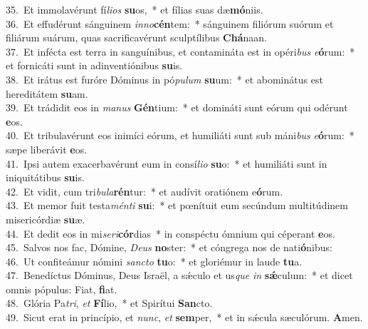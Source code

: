 {35.~}Et immolavérunt fí\textit{li}\textit{os} \textbf{su}os,~* et fílias suas dæ\textbf{mó}niis.\\
{36.~}Et effudérunt sánguinem \textit{in}\textit{no}\textbf{cén}tem:~* sánguinem filiórum suórum et filiárum suárum, quas sacrificavérunt sculptílibus \textbf{Chá}naan.\\
{37.~}Et infécta est terra in sanguínibus, et contamináta est in opéri\textit{bus} \textit{e}\textbf{ó}rum:~* et fornicáti sunt in adinventiónibus \textbf{su}is.\\
{38.~}Et irátus est furóre Dóminus in pó\textit{pu}\textit{lum} \textbf{su}um:~* et abominátus est hereditátem \textbf{su}am.\\
{39.~}Et trádidit eos in \textit{ma}\textit{nus} \textbf{Gén}tium:~* et domináti sunt eórum qui odérunt \textbf{e}os.\\
{40.~}Et tribulavérunt eos inimíci eórum, et humiliáti sunt sub máni\textit{bus} \textit{e}\textbf{ó}rum:~* sæpe liberávit \textbf{e}os.\\
{41.~}Ipsi autem exacerbavérunt eum in consí\textit{li}\textit{o} \textbf{su}o:~* et humiliáti sunt in iniquitátibus \textbf{su}is.\\
{42.~}Et vidit, cum tri\textit{bu}\textit{la}\textbf{rén}tur:~* et audívit oratiónem e\textbf{ó}rum.\\
{43.~}Et memor fuit testa\textit{mén}\textit{ti} \textbf{su}i:~* et pœnítuit eum secúndum multitúdinem misericórdiæ \textbf{su}æ.\\
{44.~}Et dedit eos in mi\textit{se}\textit{ri}\textbf{cór}dias~* in conspéctu ómnium qui céperant \textbf{e}os.\\
{45.~}Salvos nos fac, Dómine, \textit{De}\textit{us} \textbf{no}ster:~* et cóngrega nos de nati\textbf{ó}nibus:\\
{46.~}Ut confiteámur nómini \textit{san}\textit{cto} \textbf{tu}o:~* et gloriémur in laude \textbf{tu}a.\\
{47.~}Benedíctus Dóminus, Deus Israël, a sǽculo et us\textit{que} \textit{in} \textbf{sǽ}culum:~* et dicet omnis pópulus: Fiat, \textbf{fi}at.\\
{48.~}Glória Pa\textit{tri}, \textit{et} \textbf{Fí}lio,~* et Spirítui \textbf{San}cto.\\
{49.~}Sicut erat in princípio, et \textit{nunc}, \textit{et} \textbf{sem}per,~* et in sǽcula sæculórum. \textbf{A}men.\\
